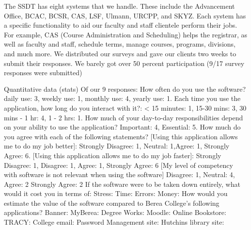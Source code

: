 The SSDT has eight systems that we handle. These include the Advancement Office, BCAC, BCSR, CAS, LSF, Ulmann, URCPP, and SKYZ. Each system has a specific functionality to aid our faculty and staff clientele perform their jobs. For example, CAS (Course Administration and Scheduling) helps the registrar, as well as faculty and staff, schedule terms, manage courses, programs, divisions, and much more.
We distributed our surveys and gave our clients two weeks to submit their responses. We barely got over 50 percent participation (9/17 survey responses were submitted)


Quantitative data (stats)
Of our 9 responses: %
How often do you use the software? daily use: 3, weekly use: 1, monthly use: 4, yearly use: 1.
Each time you use the  application, how long do you interact with it?: < 15 minutes: 1, 15-30 mins: 3, 30 mins - 1 hr: 4, 1 - 2 hrs: 1.
How much of your day-to-day responsibilities depend on your ability to use the  application? Important: 4, Essential: 5.
How much do you agree with each of the following statements?
[Using this application allows me to do my job better]: Strongly Disagree: 1, Neutral: 1,Agree: 1, Strongly Agree: 6.
[Using this application allows me to do my job faster]: Strongly Disagree: 1, Disagree: 1, Agree: 1, Strongly Agree: 6
[My level of competency with software is not relevant when using the software] Disagree: 1, Neutral: 4, Agree: 2 Strongly Agree: 2
If the software were to be taken down entirely, what would it cost you in terms of:
Stress:
Time:
Errors:
Money:
How would you estimate the value of the software compared to Berea College's following applications?
Banner:
MyBerea:
Degree Works:
Moodle:
Online Bookstore:
TRACY:
College email:
Password Management site:
Hutchins library site:
